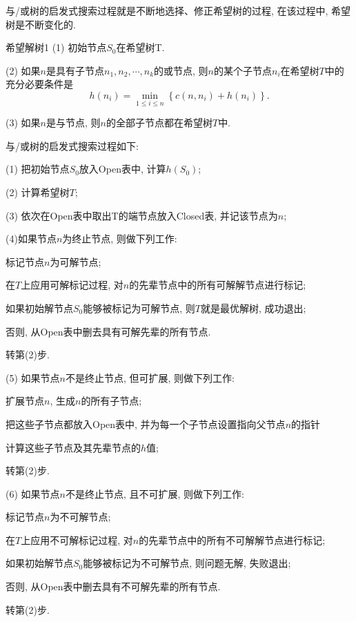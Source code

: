 与/或树的启发式搜索过程就是不断地选择、修正希望树的过程, 在该过程中, 希望树是不断变化的.
\begin{mydef}{希望解树}{1}
(1) 初始节点$S_0$在希望树T.

(2) 如果$n$是具有子节点$n_1, n_2,\cdots, n_k$的或节点, 则$n$的某个子节点$n_i$在希望树$T$中的充分必要条件是
     $$h\left(n_{i}\right)=\min _{1 \leq i \leq n}\left\{c\left(n, n_{i}\right)+h\left(n_{i}\right)\right\}.$$

(3) 如果$n$是与节点, 则$n$的全部子节点都在希望树$T$中.

与/或树的启发式搜索过程如下:

(1) 把初始节点$S_0$放入Open表中, 计算$h(S_0)$;

(2) 计算希望树$T$;

(3) 依次在Open表中取出T的端节点放入Closed表, 并记该节点为$n$;

(4)如果节点$n$为终止节点, 则做下列工作:

    标记节点$n$为可解节点;

     在$T$上应用可解标记过程, 对$n$的先辈节点中的所有可解解节点进行标记;

     如果初始解节点$S_0$能够被标记为可解节点, 则$T$就是最优解树, 成功退出;

     否则, 从Open表中删去具有可解先辈的所有节点.

    转第(2)步.

(5) 如果节点$n$不是终止节点, 但可扩展, 则做下列工作:

    扩展节点$n$, 生成$n$的所有子节点;

     把这些子节点都放入Open表中, 并为每一个子节点设置指向父节点$n$的指针

    计算这些子节点及其先辈节点的$h$值;

     转第(2)步.

(6) 如果节点$n$不是终止节点, 且不可扩展, 则做下列工作:

    标记节点$n$为不可解节点;

     在$T$上应用不可解标记过程, 对$n$的先辈节点中的所有不可解解节点进行标记;

     如果初始解节点$S_0$能够被标记为不可解节点, 则问题无解, 失败退出;

    否则, 从Open表中删去具有不可解先辈的所有节点.

     转第(2)步.
\end{mydef}

